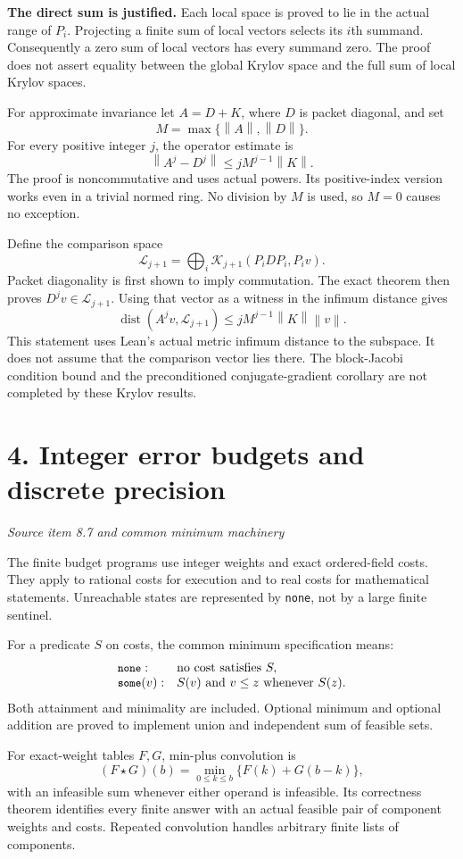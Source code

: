 \documentclass[11pt]{article}
\newcommand{\code}[1]{\texttt{\small #1}}
\newcommand{\pageheading}[2]{\section*{\color{ink}#1}\textit{#2}\par}
\newcommand{\norm}[1]{\left\lVert#1\right\rVert}
\begin{document}
\textbf{The direct sum is justified.} Each local space is proved to lie in the actual range of $P_i$. Projecting a finite sum of local vectors selects its $i$th summand. Consequently a zero sum of local vectors has every summand zero. The proof does not assert equality between the global Krylov space and the full sum of local Krylov spaces.

For approximate invariance let $A=D+K$, where $D$ is packet diagonal, and set
\[
M=\max\{\norm{A},\norm{D}\}.
\]
For every positive integer $j$, the operator estimate is
\[
\boxed{\norm{A^j-D^j}\leq jM^{j-1}\norm{K}.}
\]
The proof is noncommutative and uses actual powers. Its positive-index version works even in a trivial normed ring. No division by $M$ is used, so $M=0$ causes no exception.

Define the comparison space
\[
\mathcal L_{j+1}=\bigoplus_i\mathcal K_{j+1}(P_iDP_i,P_iv).
\]
Packet diagonality is first shown to imply commutation. The exact theorem then proves $D^jv\in\mathcal L_{j+1}$. Using that vector as a witness in the infimum distance gives
\[
\boxed{\operatorname{dist}(A^jv,\mathcal L_{j+1})
\leq jM^{j-1}\norm{K}\norm{v}.}
\]
This statement uses Lean's actual metric infimum distance to the subspace. It does not assume that the comparison vector lies there. The block-Jacobi condition bound and the preconditioned conjugate-gradient corollary are not completed by these Krylov results.

\newpage
\pageheading{4. Integer error budgets and discrete precision}{Source item 8.7 and common minimum machinery}
The finite budget programs use integer weights and exact ordered-field costs. They apply to rational costs for execution and to real costs for mathematical statements. Unreachable states are represented by \code{none}, not by a large finite sentinel.

For a predicate $S$ on costs, the common minimum specification means:
\[
\begin{array}{ll}
\code{none}: & \text{no cost satisfies }S,\\
\code{some}(v): & S(v)\text{ and }v\leq z\text{ whenever }S(z).
\end{array}
\]
Both attainment and minimality are included. Optional minimum and optional addition are proved to implement union and independent sum of feasible sets.

For exact-weight tables $F,G$, min-plus convolution is
\[
(F\star G)(b)=\min_{0\leq k\leq b}\{F(k)+G(b-k)\},
\]
with an infeasible sum whenever either operand is infeasible. Its correctness theorem identifies every finite answer with an actual feasible pair of component weights and costs. Repeated convolution handles arbitrary finite lists of components.
\end{document}
